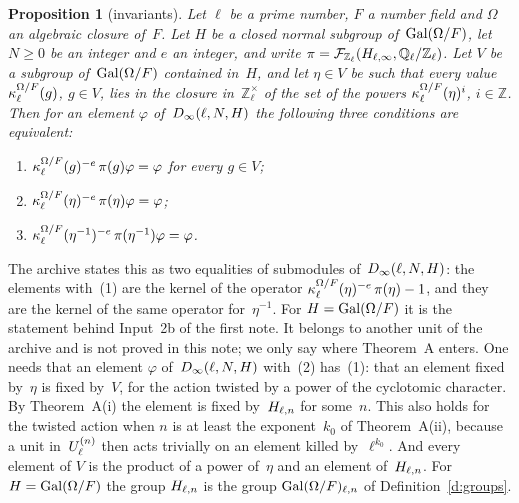 \documentclass[11pt,a4paper]{article}
\makeatletter
\newcommand{\lean}[1]{\csname LN@#1\endcsname}
\newcommand{\Z}{\mathbb{Z}}
\newcommand{\m}[1]{\mbox{$#1$}}        %
\newcommand{\leantag}{{\sffamily\bfseries\fontsize{6.3}{8}\selectfont\color{leancol}\addfontfeatures{LetterSpace=7}LEAN}}
\newcommand{\leanline}[1]{\par\nopagebreak\vspace{-2.5pt}{\fontsize{8.9}{12.4}\selectfont\color{inksoft}\raggedright
  \noindent\llap{\leantag\hspace{9pt}}#1\par}\vspace{1pt}}
\theoremstyle{plainx}
\newtheorem{proposition}[theorem]{Proposition}
\theoremstyle{uprightx}
\makeatother
\begin{document}
\begin{proposition}[invariants]\label{p:inv}
Let $\ell$ be a prime number, $F$ a number field and $\Omega$ an algebraic closure of~$F$. Let $H$ be a closed
normal subgroup of~$\operatorname{Gal}(\Omega/F)$, let \m{N\ge0} be an integer and $e$ an integer, and write
\m{\pi=\funRep{\Z_\ell}{\QZl{\ell}}{\cycU{\ell}{H}}}. Let $V$ be a subgroup of~$\operatorname{Gal}(\Omega/F)$ contained in~$H$,
and let \m{\eta\in V} be such that every value \m{\cyc{F}{\Omega}{\ell}{g}}, \m{g\in V}, lies in the closure
in~$\Z_\ell^\times$ of the set of the powers \m{\cyc{F}{\Omega}{\ell}{\eta}^{i}}, \m{i\in\Z}. Then for an element
$\varphi$ of~$D_\infty(\ell,N,H)$ the following three conditions are equivalent:
\begin{enumerate}[label=\textup{(\arabic*)},topsep=2pt,itemsep=2pt]
\item \m{\cyc{F}{\Omega}{\ell}{g}^{-e}\,\pi(g)\varphi=\varphi} for every \m{g\in V};
\item \m{\cyc{F}{\Omega}{\ell}{\eta}^{-e}\,\pi(\eta)\varphi=\varphi};
\item \m{\cyc{F}{\Omega}{\ell}{\eta^{-1}}^{-e}\,\pi(\eta^{-1})\varphi=\varphi}.
\end{enumerate}
\end{proposition}
\leanline{\lean{shaDGen}}

The archive states this as two equalities of submodules of~$D_\infty(\ell,N,H)$: the elements with~(1) are the
kernel of the operator \m{\cyc{F}{\Omega}{\ell}{\eta}^{-e}\,\pi(\eta)-1}, and they are the kernel of the same
operator for~$\eta^{-1}$. For \m{H=\GalG{F}{\Omega}} it is the statement behind Input~2b of the first note. It
belongs to another unit of the archive and is not proved in this note; we only say where Theorem~A enters. One
needs that an element $\varphi$ of~$D_\infty(\ell,N,H)$ with~(2) has~(1): that an element fixed by~$\eta$ is fixed
by~$V$, for the action twisted by a power of the cyclotomic character. By Theorem~A(i) the element is fixed
by~$H_{\ell,n}$ for some~$n$. This also holds for the twisted action when $n$ is at least the
exponent~$k_0$ of Theorem~A(ii), because a unit in~$U_{\ell}^{(n)}$ then acts trivially on an element killed
by~$\ell^{k_0}$. And every element of $V$ is the product of a power of~$\eta$ and an element
of~$H_{\ell,n}$. For \m{H=\GalG{F}{\Omega}} the group $H_{\ell,n}$ is the group
$\operatorname{Gal}(\Omega/F)_{\ell,n}$ of Definition~\ref{d:groups}.
\end{document}
